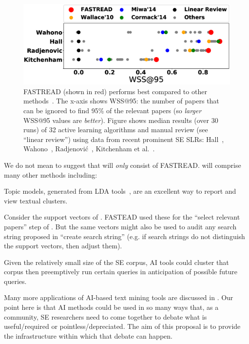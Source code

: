 \begin{figure}
    \centering
    \includegraphics[width=1\linewidth]{figure_codes_chart.eps}
    \caption{FASTREAD (shown in red) performs best compared to  other methods~\cite{cormack2014evaluation,wallace2010active,miwa2014reducing}.
 The x-axis shows  WSS@95:  the number of papers that can be ignored to find 95\% of the relevant papers
    (so {\em larger} WSS@95 values are {\em better}).
Figure shows
median results (over 30 runs) of 32 active learning algorithms and manual review (see ``linear review'') 
using data from   recent prominent SE SLRs: 
    Hall~\cite{hall2012systematic}, Wahono~\cite{wahono2015systematic}, Radjenovi{\'c}~\cite{radjenovic2013software}, Kitchenham et al.~\cite{kitchenham2013systematic}.
    }
    \label{fig:Core}
\end{figure} 

We do not mean to suggest that {\IT} will {\em only} consist of FASTREAD. {\IT} will comprise many other methods including:
\bii
\item
Topic models, generated from LDA tools~\cite{Biggers-etal:12},  are an excellent way to report and view  textual clusters.
\item
Consider the support vectors of . FASTEAD used these for the ``select relevant papers'' step of .
But the same vectors might also be used to audit any search string proposed in   ``create search string'' (e.g. if search strings do not distinguish the support vectors, then   adjust them).
\item
Given the relatively small size of the SE corpus, AI tools could
cluster that corpus then preemptively run certain queries in anticipation
of possible future queries.
\item
Many more applications of AI-based text mining tools are discussed in .
\eii
Our point here is that  AI methods   could be used in so many ways that, as a community, SE researchers need to come together to debate what is useful/required or pointless/depreciated.   The aim of this proposal is to provide the {\IT} infrastructure within which that debate can happen. 


